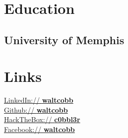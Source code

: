 \documentclass[12pt]{resume}
\begin{document}
\begin{minipage}[t]{0.33\textwidth}

\section{Education} 

\subsection{University of Memphis}

\sectionsep



\section{Links} 
\href{https://www.linkedin.com/in/waltcobb}{LinkedIn://  \bf waltcobb} \\
\href{https://github.com/waltcobb}{Github:// \bf waltcobb} \\
\href{https://www.hackthebox.eu/profile/9693}{HackTheBox:// \bf c0bbl3r} \\
\href{https://facebook.com/waltcobb}{Facebook:// \bf waltcobb}


%
%

\end{minipage} 
\hfill
\end{document}
